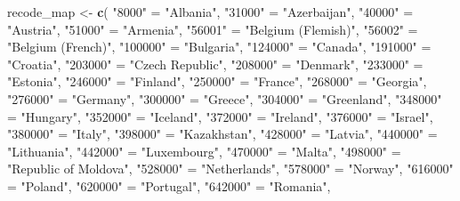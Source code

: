 \documentclass[
]{article}
\newenvironment{Shaded}{\begin{snugshade}}{\end{snugshade}}
\newcommand{\FunctionTok}[1]{\textcolor[rgb]{0.13,0.29,0.53}{\textbf{#1}}}
\newcommand{\NormalTok}[1]{#1}
\newcommand{\OtherTok}[1]{\textcolor[rgb]{0.56,0.35,0.01}{#1}}
\newcommand{\StringTok}[1]{\textcolor[rgb]{0.31,0.60,0.02}{#1}}
\begin{document}
\begin{Shaded}
\begin{Highlighting}[]
\NormalTok{recode\_map }\OtherTok{\textless{}{-}} \FunctionTok{c}\NormalTok{(}
  \StringTok{"8000"}   \OtherTok{=} \StringTok{"Albania"}\NormalTok{,}
  \StringTok{"31000"}  \OtherTok{=} \StringTok{"Azerbaijan"}\NormalTok{,}
  \StringTok{"40000"}  \OtherTok{=} \StringTok{"Austria"}\NormalTok{,}
  \StringTok{"51000"}  \OtherTok{=} \StringTok{"Armenia"}\NormalTok{,}
  \StringTok{"56001"}  \OtherTok{=} \StringTok{"Belgium (Flemish)"}\NormalTok{,}
  \StringTok{"56002"}  \OtherTok{=} \StringTok{"Belgium (French)"}\NormalTok{,}
  \StringTok{"100000"} \OtherTok{=} \StringTok{"Bulgaria"}\NormalTok{,}
  \StringTok{"124000"} \OtherTok{=} \StringTok{"Canada"}\NormalTok{,}
  \StringTok{"191000"} \OtherTok{=} \StringTok{"Croatia"}\NormalTok{,}
  \StringTok{"203000"} \OtherTok{=} \StringTok{"Czech Republic"}\NormalTok{,}
  \StringTok{"208000"} \OtherTok{=} \StringTok{"Denmark"}\NormalTok{,}
  \StringTok{"233000"} \OtherTok{=} \StringTok{"Estonia"}\NormalTok{,}
  \StringTok{"246000"} \OtherTok{=} \StringTok{"Finland"}\NormalTok{,}
  \StringTok{"250000"} \OtherTok{=} \StringTok{"France"}\NormalTok{,}
  \StringTok{"268000"} \OtherTok{=} \StringTok{"Georgia"}\NormalTok{,}
  \StringTok{"276000"} \OtherTok{=} \StringTok{"Germany"}\NormalTok{,}
  \StringTok{"300000"} \OtherTok{=} \StringTok{"Greece"}\NormalTok{,}
  \StringTok{"304000"} \OtherTok{=} \StringTok{"Greenland"}\NormalTok{,}
  \StringTok{"348000"} \OtherTok{=} \StringTok{"Hungary"}\NormalTok{,}
  \StringTok{"352000"} \OtherTok{=} \StringTok{"Iceland"}\NormalTok{,}
  \StringTok{"372000"} \OtherTok{=} \StringTok{"Ireland"}\NormalTok{,}
  \StringTok{"376000"} \OtherTok{=} \StringTok{"Israel"}\NormalTok{,}
  \StringTok{"380000"} \OtherTok{=} \StringTok{"Italy"}\NormalTok{,}
  \StringTok{"398000"} \OtherTok{=} \StringTok{"Kazakhstan"}\NormalTok{,}
  \StringTok{"428000"} \OtherTok{=} \StringTok{"Latvia"}\NormalTok{,}
  \StringTok{"440000"} \OtherTok{=} \StringTok{"Lithuania"}\NormalTok{,}
  \StringTok{"442000"} \OtherTok{=} \StringTok{"Luxembourg"}\NormalTok{,}
  \StringTok{"470000"} \OtherTok{=} \StringTok{"Malta"}\NormalTok{,}
  \StringTok{"498000"} \OtherTok{=} \StringTok{"Republic of Moldova"}\NormalTok{,}
  \StringTok{"528000"} \OtherTok{=} \StringTok{"Netherlands"}\NormalTok{,}
  \StringTok{"578000"} \OtherTok{=} \StringTok{"Norway"}\NormalTok{,}
  \StringTok{"616000"} \OtherTok{=} \StringTok{"Poland"}\NormalTok{,}
  \StringTok{"620000"} \OtherTok{=} \StringTok{"Portugal"}\NormalTok{,}
  \StringTok{"642000"} \OtherTok{=} \StringTok{"Romania"}\NormalTok{,}

\end{Highlighting}
\end{Shaded}
\end{document}

